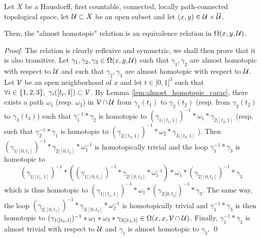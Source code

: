 \begin{lem} 
 Let $X$ be a Hausdorff, first countable, connected, locally path-connected topological space, let $\mathcal{U}\subset X$ be an open subset and let $(x,y)\in \mathcal{U}\times \overline {\mathcal{U}}$.
 
 Then, the "almost homotopic" relation is an equivalence relation in $\Omega(x,y,\mathcal{U})$.
 
\end{lem}
\begin{proof}
The relation is clearly reflexive and symmetric, we shall then prove that it is also transitive. Let $\gamma_1, \gamma_2,\gamma_3 \in \Omega(x,y,\mathcal{U})$ such that $\gamma_1,\gamma_2$ are almost homotopic with respect to $\mathcal{U}$ and such that
$\gamma_2,\gamma_3$ are almost homotopic with respect to $\mathcal{U}$. Let $\mathcal V$ be an open neighborhood of $x$ and let $t \in ]0,1[^3$ such that $\forall i\in\{1,2,3\},\ \gamma_i([t_i,1])\subset \V$. By Lemma \ref{lem:almost_homotopic_carac}, there exists a path $\omega_{1}$ (resp. $\omega_2$)  in $\mathcal V\cap \mathcal{U}$ from $\gamma_1(t_1)$ to $\gamma_2(t_2)$ (resp. from $\gamma_2(t_2)$ to $\gamma_3(t_3)$) such that $\gamma_1^{-1}*\gamma_2$ is homotopic to $(\gamma_{1|[t_1,1]})^{-1}
*\omega_1*\gamma_{2|[t_2,1]}$ (resp. such that $\gamma_2^{-1}*\gamma_1$ is homotopic to $(\gamma_{2|[t_2,1]})^{-1}*\omega_2*\gamma_{3|[t_3,1]}$ ). Then $(\gamma_{1|[0,t_1]})^{-1}*\gamma_{2|[0,t_2]}*\omega_1^{-1}$ is 
homotopically trivial and the loop
 $\gamma_{1}^{-1}*\gamma_3$ is homotopic to 
 $$(\gamma_{1|[t_1,1]})^{-1}*\left((\gamma_{1|[0,t_1]})^{-1}*\gamma_{2|[0,t_2]}*\omega_1^{-1}\right)*\omega_1*(\gamma_{2|[0,t_2]})^{-1}*\gamma_3$$ which is thus homotopic to $(\gamma_{1|[t_1,1]})^{-1}*\omega_1*(\gamma_{2|[0,t_2[})^{-1}*\gamma_3$. The same way, the loop $(\gamma_{2|[0,t_1]})^{-1}*\gamma_{3|[0,t_3]}*\omega_2^{-1}$ is homotopically trivial and $\gamma_{1}^{-1}*\gamma_3$ is then homotopic to $(\gamma_{1|[t_0,1]})^{-1}*\omega_1*\omega_3*\gamma_{3|[t_3,1]} \in \Omega(x,x,\mathcal V\cap \mathcal{U})$. 
 Finally, $\gamma_{1}^{-1}*\gamma_3$ is almost trivial with respect to $\mathcal{U}$ and $\gamma_1$ is almost homotopic to $\gamma_3$.
\qed\end{proof}

